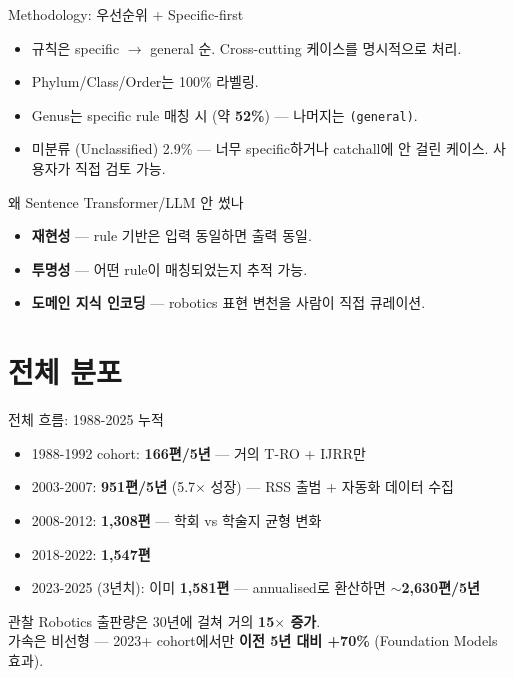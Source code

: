 \documentclass[aspectratio=169,t]{beamer}
\newcommand{\hot}[1]{\textcolor{accentorange}{\textbf{#1}}}
\newcommand{\cool}[1]{\textcolor{accentblue}{\textbf{#1}}}
\begin{document}
\begin{frame}{Methodology: 우선순위 + Specific-first}
\begin{itemize}
  \item 규칙은 specific $\to$ general 순. Cross-cutting 케이스를 명시적으로 처리.
  \item Phylum/Class/Order는 100\% 라벨링.
  \item Genus는 specific rule 매칭 시 (약 \hot{52\%}) — 나머지는 \texttt{(general)}.
  \item 미분류 (Unclassified) 2.9\% — 너무 specific하거나 catchall에 안 걸린 케이스. 사용자가 직접 검토 가능.
\end{itemize}
\vfill
\begin{block}{왜 Sentence Transformer/LLM 안 썼나}
\small
\begin{itemize}
\item \cool{재현성} — rule 기반은 입력 동일하면 출력 동일.
\item \cool{투명성} — 어떤 rule이 매칭되었는지 추적 가능.
\item \cool{도메인 지식 인코딩} — robotics 표현 변천을 사람이 직접 큐레이션.
\end{itemize}
\end{block}
\end{frame}

\section{전체 분포}


\begin{frame}{전체 흐름: 1988-2025 누적}
\begin{itemize}
  \item 1988-1992 cohort: \cool{166편/5년} — 거의 T-RO + IJRR만
  \item 2003-2007: \hot{951편/5년} (5.7$\times$ 성장) — RSS 출범 + 자동화 데이터 수집
  \item 2008-2012: \hot{1{,}308편} — 학회 vs 학술지 균형 변화
  \item 2018-2022: \hot{1{,}547편}
  \item 2023-2025 (3년치): 이미 \hot{1{,}581편} — annualised로 환산하면 \cool{$\sim$2{,}630편/5년}
\end{itemize}
\vfill
\begin{block}{관찰}
\small Robotics 출판량은 30년에 걸쳐 거의 \hot{15$\times$ 증가}. \\
가속은 비선형 — 2023+ cohort에서만 \cool{이전 5년 대비 +70\%} (Foundation Models 효과).
\end{block}
\end{frame}
\end{document}
